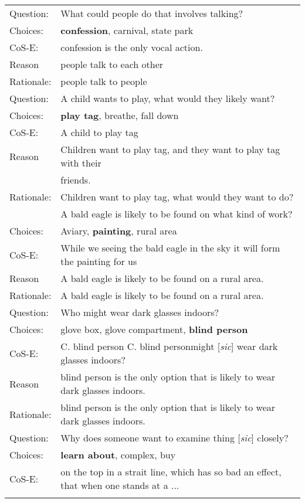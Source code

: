 \documentclass[11pt,a4paper]{article}
\begin{document}
\begin{table}[!t]
\centering
\scriptsize
\setlength{\tabcolsep}{1pt}
\begin{tabular}{ll}
\toprule
Question: &What could people do that involves talking?\\ 
Choices: &\textbf{confession}, carnival, state park \\
CoS-E: & confession is the only vocal action.\\
Reason & people talk to each other\\
Rationale: & people talk to people\\
\midrule
Question: &A child wants to play, what would they likely want?\\ 
Choices: &\textbf{play tag}, breathe, fall down\\
CoS-E: &A child to play tag \\
Reason &Children want to play tag, and they want to play tag with their\\
&friends.\\
Rationale: &Children want to play tag, what would they want to do?\\
\midrule
\begin{comment}
Question: &A bald eagle is likely to be found on what kind of work?\\ 
Choices: &Aviary, \textbf{painting}, rural area\\
CoS-E: &While we seeing the bald eagle in the sky it will form the painting for us \\
Reason &A bald eagle is likely to be found on a rural area.\\
Rationale: &A bald eagle is likely to be found on a rural area.\\
\midrule
Question: &Who might wear dark glasses indoors?\\ 
Choices: &glove box, glove compartment, \textbf{blind person}\\
CoS-E: &C. blind person C. blind personmight [{\it sic}] wear dark glasses indoors?\\
Reason &blind person is the only option that is likely to wear dark glasses indoors.\\
Rationale: &blind person is the only option that is likely to wear dark glasses indoors.\\
\hline
Question: &Why does someone want to examine thing [{\it sic}] closely?\\ 
Choices: &\textbf{learn about}, complex, buy\\
CoS-E: &on the top in a strait line, which has so bad an effect, that when one stands at a ...\\

\end{comment}
\end{tabular}
\end{table}
\end{document}
